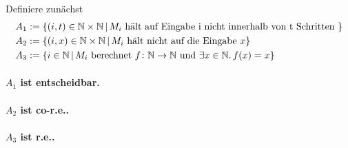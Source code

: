 
Definiere zunächst
\begin{align*}
	A_1 & := \{ (i,t) \in \mathbb{N} \times \mathbb{N} \,|\, M_i \text{ hält auf Eingabe
	i nicht innerhalb von t Schritten } \} \\
	A_2 & := \{ (i,x) \in \mathbb{N} \times \mathbb{N} \,|\, M_i \text{ hält nicht auf
	die Eingabe } x\} \\
	A_3 & := \{ i \in \mathbb{N} \,|\, M_i \text{ berechnet } f
	\colon \mathbb{N} \to \mathbb{N} \text{ und } \exists x \in
	\mathbb{N} .\, f(x) = x \}
\end{align*}

\paragraph{$A_1$ ist entscheidbar.}
\par

\paragraph{$A_2$ ist co-r.e..}
\par

\paragraph{$A_3$ ist r.e..}
\par
